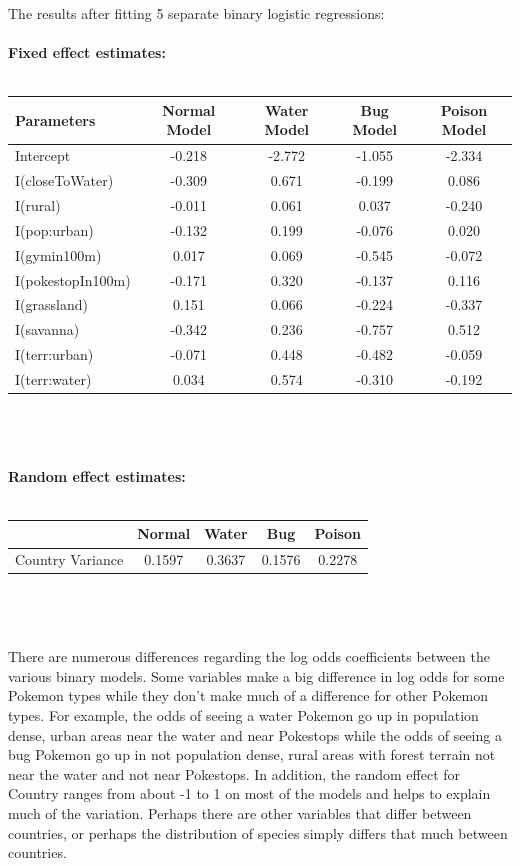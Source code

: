 \documentclass{article}
\begin{document}
\noindent The results after fitting 5 separate binary logistic regressions: \\ 
\\ 
\textbf{Fixed effect estimates:} \\ \\ 
\begin{tabular}{| l | c | c | c | c |}
	\hline
	Parameters & Normal Model & Water Model & Bug Model & Poison Model \\
	\hline 
	Intercept & -0.218 & -2.772 & -1.055 & -2.334 \\ 
	I(closeToWater) & -0.309 & 0.671 & -0.199 & 0.086 \\ 
	I(rural) & -0.011 & 0.061 & 0.037 & -0.240\\ 
	I(pop:urban) & -0.132 & 0.199 & -0.076 & 0.020 \\ 
	I(gymin100m) & 0.017 & 0.069 & -0.545 &  -0.072 \\ 
	I(pokestopIn100m) & -0.171 & 0.320 & -0.137 & 0.116 \\ 
	I(grassland) & 0.151 & 0.066 & -0.224 & -0.337 \\ 
	I(savanna) & -0.342 & 0.236 & -0.757 & 0.512 \\ 
	I(terr:urban) & -0.071 & 0.448 & -0.482 & -0.059  \\ 
	I(terr:water) & 0.034 & 0.574 & -0.310 & -0.192 \\ 
	\hline
\end{tabular} 
\\ 
\\ 
\\ 
\textbf{Random effect estimates:} \\ \\ 
\begin{tabular}{| l | c | c | c | c |}
	\hline
	& Normal & Water & Bug & Poison \\  
	\hline
	Country Variance & 0.1597 & 0.3637 & 0.1576 & 0.2278 \\ 
	\hline
\end{tabular} 
\\ 
\\ 
\\ 
There are numerous differences regarding the log odds coefficients between the various binary models. Some variables make a big difference in log odds for some Pokemon types while they don't make much of a difference for other Pokemon types. For example, the odds of seeing a water Pokemon go up in population dense, urban areas near the water and near Pokestops while the odds of seeing a bug Pokemon go up in not population dense, rural areas with forest terrain not near the water and not near Pokestops. In addition, the random effect for Country ranges from about -1 to 1 on most of the models and helps to explain much of the variation. Perhaps there are other variables that differ between countries, or perhaps the distribution of species simply differs that much between countries. 
\end{document}
